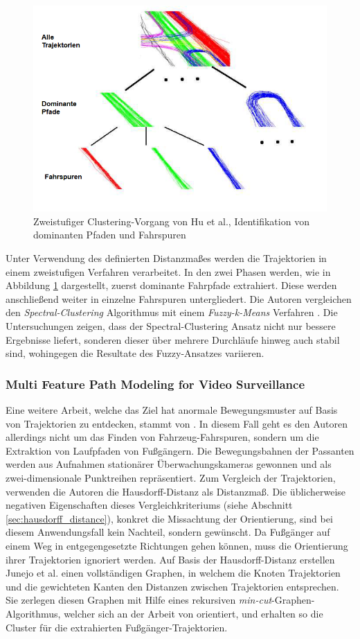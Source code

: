 \begin{figure}[H]
    \centering
    \includegraphics[width=0.5\linewidth]{resources/img/RelatedWork/Fu_HierarchicalClustering}
    \caption[Zweistufiger Clustering-Vorgang von Hu et al.]
            {Zweistufiger Clustering-Vorgang von Hu et al., Identifikation von dominanten Pfaden und Fahrspuren \cite[]{Hu2005}}
    \label{fig:relw_hu_two_step_cluster}
\end{figure}

Unter Verwendung des definierten Distanzmaßes werden die Trajektorien in einem zweistufigen Verfahren verarbeitet.
In den zwei Phasen werden, wie in Abbildung \ref{fig:relw_hu_two_step_cluster} dargestellt, zuerst dominante
Fahrpfade extrahiert. Diese werden anschließend weiter in einzelne Fahrspuren untergliedert.
Die Autoren vergleichen den \textit{Spectral-Clustering} Algorithmus \cite[]{Ng2002}
mit einem \textit{Fuzzy-k-Means} Verfahren \cite[]{xie1991validity}.
Die Untersuchungen zeigen, dass der Spectral-Clustering Ansatz nicht nur bessere Ergebnisse liefert, sonderen dieser
über mehrere Durchläufe hinweg auch stabil sind, wohingegen die Resultate des Fuzzy-Ansatzes variieren.


\subsubsection*{Multi Feature Path Modeling for Video Surveillance}
Eine weitere Arbeit, welche das Ziel hat anormale Bewegungsmuster auf Basis von Trajektorien zu entdecken,
stammt von \cite[]{Junejo2004}. In diesem Fall geht es den Autoren allerdings nicht um das Finden von Fahrzeug-Fahrspuren,
sondern um die Extraktion von Laufpfaden von Fußgängern.
Die Bewegungsbahnen der Passanten werden aus Aufnahmen stationärer Überwachungskameras gewonnen und
als zwei-dimensionale Punktreihen repräsentiert.
Zum Vergleich der Trajektorien, verwenden die Autoren die Hausdorff-Distanz als Distanzmaß.
Die üblicherweise negativen Eigenschaften dieses
Vergleichkriteriums (siehe Abschnitt \ref{sec:hausdorff_distance}), konkret die Missachtung der
Orientierung, sind bei diesem Anwendungsfall kein Nachteil, sondern gewünscht.
Da Fußgänger auf einem Weg in entgegengesetzte Richtungen gehen können, muss die Orientierung
ihrer Trajektorien ignoriert werden.
Auf Basis der Hausdorff-Distanz erstellen Junejo et al. einen vollständigen Graphen, in welchem die Knoten Trajektorien
und die gewichteten Kanten den Distanzen zwischen Trajektorien entsprechen.
Sie zerlegen diesen Graphen mit Hilfe eines rekursiven \textit{min-cut}-Graphen-Algorithmus, welcher sich
an der Arbeit von \cite[]{boykov2004experimental} orientiert, und erhalten so die Cluster für die
extrahierten Fußgänger-Trajektorien.

